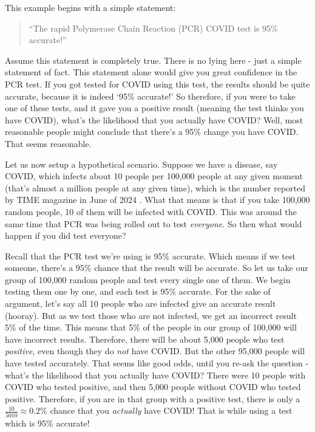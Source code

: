 \documentclass[10pt]{article}
\begin{document}
\begin{multicols}{2}
This example begins with a simple statement:
\begin{quotation}
``The rapid Polymerase Chain Reaction (PCR) COVID test is 95\% accurate!''
\end{quotation}
Assume this statement is completely true. There is no lying here - just a simple statement of fact. This statement alone would give you great confidence in the PCR test. If you got tested for COVID using this test, the results should be quite accurate, because it is indeed `95\% accurate!' So therefore, if you were to take one of these tests, and it gave you a positive result (meaning the test thinks you have COVID), what's the likelihood that you actually have COVID? Well, most reasonable people might conclude that there's a 95\% change you have COVID. That seems reasonable. 

Let us now setup a hypothetical scenario. Suppose we have a disease, say COVID, which infects about 10 people per 100,000 people at any given moment (that's almost a million people at any given time), which is the number reported by TIME magazine in June of 2024 \cite{TIME}. What that means is that if you take 100,000 random people, 10 of them will be infected with COVID. This was around the same time that PCR was being rolled out to test \textit{everyone}. So then what would happen if you did test everyone?

Recall that the PCR test we're using is 95\% accurate. Which means if we test someone, there's a 95\% chance that the result will be accurate. So let us take our group of 100,000 random people and test every single one of them. We begin testing them one by one, and each test is 95\% accurate. For the sake of argument, let's say all 10 people who are infected give an accurate result (hooray). But as we test those who are not infected, we get an incorrect result 5\% of the time. This means that 5\% of the people in our group of 100,000 will have incorrect results. Therefore, there will be about 5,000 people who test \textit{positive}, even though they do \textit{not} have COVID. But the other 95,000 people will have tested accurately. That seems like good odds, until you re-ask the question - what's the likelihood that you actually have COVID? There were 10 people with COVID who tested positive, and then 5,000 people without COVID who tested positive. Therefore, if you are in that group with a positive test, there is only a $\frac{10}{5010} \approx 0.2\%$ chance that you \textit{actually} have COVID! That is while using a test which is 95\% accurate!
 






\end{multicols}
\end{document}
